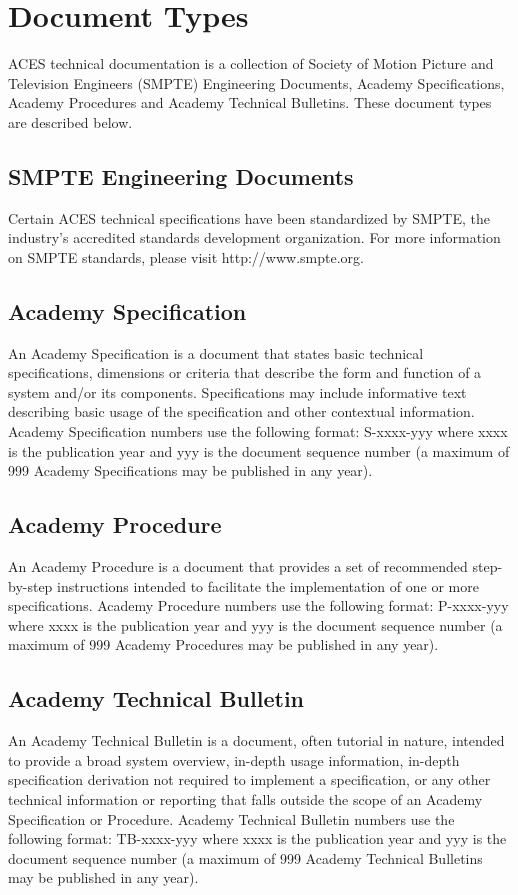 \regularsectionformat
\chapter{Document Types}

ACES technical documentation is a collection of Society of Motion Picture and Television Engineers (SMPTE) Engineering Documents, Academy Specifications, Academy Procedures and Academy Technical Bulletins. These document types are described below.

\section{SMPTE Engineering Documents}
Certain ACES technical specifications have been standardized by SMPTE, the industry's accredited standards development organization. For more information on SMPTE standards, please visit http://www.smpte.org.

\section{Academy Specification}
An Academy Specification is a document that states basic technical specifications, dimensions or criteria that describe the form and function of a system and/or its components.  Specifications may include informative text describing basic usage of the specification and other contextual information. Academy Specification numbers use the following format: S-xxxx-yyy where xxxx is the publication year and yyy is the document sequence number (a maximum of 999 Academy Specifications may be published in any year).

\section{Academy Procedure}
An Academy Procedure is a document that provides a set of recommended step-by-step instructions intended to facilitate the implementation of one or more specifications. Academy Procedure numbers use the following format: P-xxxx-yyy where xxxx is the publication year and yyy is the document sequence number (a maximum of 999 Academy Procedures may be published in any year).

\section{Academy Technical Bulletin}
An Academy Technical Bulletin is a document, often tutorial in nature, intended to provide a broad system overview, in-depth usage information, in-depth specification derivation not required to implement a specification, or any other technical information or reporting that falls outside the scope of an Academy Specification or Procedure. Academy Technical Bulletin numbers use the following format: TB-xxxx-yyy where xxxx is the publication year and yyy is the document sequence number (a maximum of 999 Academy Technical Bulletins may be published in any year).
